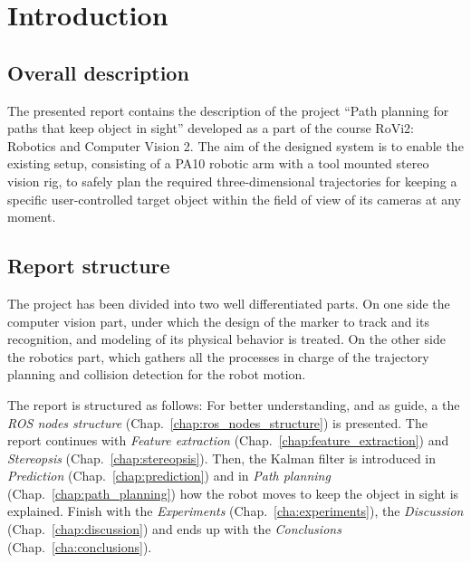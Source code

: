 
\chapter{Introduction}
\label{chap:introduction}

\section{Overall description}
\label{sec:overall_description}
The presented report contains the description of the  project ``Path planning for paths that keep
object in sight'' developed as a part of the course RoVi2: Robotics and Computer Vision 2.
The aim of the designed system is to enable the existing setup, consisting of a PA10 robotic arm with a tool mounted stereo vision rig, to safely plan the required three-dimensional trajectories for keeping a specific user-controlled target object within the field of view of its cameras at any moment.

\section{Report structure}
\label{sec:report_structure}
The project has been divided into two well differentiated parts. On one side the computer vision part, under which the design of the marker to track and its recognition, and modeling of its physical behavior is treated.
On the other side the robotics part, which gathers all the processes in charge of the trajectory planning and collision detection for the robot motion.

The report is structured as follows:
For better understanding, and as guide, a the \emph{ROS nodes structure} (Chap.~\ref{chap:ros_nodes_structure}) is presented. The report continues with \emph{Feature extraction} (Chap.~\ref{chap:feature_extraction}) and \emph{Stereopsis} (Chap.~\ref{chap:stereopsis}).
Then, the Kalman filter is introduced in \emph{Prediction} (Chap.~\ref{chap:prediction}) and in \emph{Path planning} (Chap.~\ref{chap:path_planning}) how the robot moves to keep the object in sight is explained.
Finish with the \emph{Experiments} (Chap.~\ref{cha:experiments}), the \emph{Discussion} (Chap.~\ref{chap:discussion}) and ends up with the \emph{Conclusions} (Chap.~\ref{cha:conclusions}).
